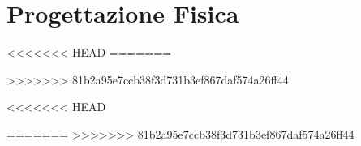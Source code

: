 \chapter{Progettazione Fisica}
<<<<<<< HEAD
=======


>>>>>>> 81b2a95e7ccb38f3d731b3ef867daf574a26ff44


<<<<<<< HEAD



=======
>>>>>>> 81b2a95e7ccb38f3d731b3ef867daf574a26ff44
